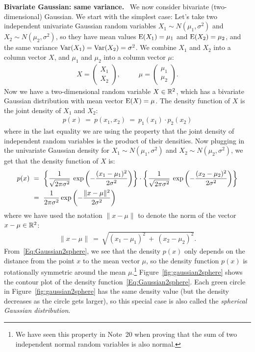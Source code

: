 \documentclass[11pt]{article}
\def\Ex#1{{\rm E}(#1)}
\def\Var#1{{\rm Var}(#1)}
\begin{document}
\smallskip
{\bf Bivariate Gaussian: same variance.}~
We now consider bivariate (two-dimensional) Gaussian. We start with the simplest case: Let's take two independent univariate Gaussian random variables $X_1 \sim N(\mu_1, \sigma^2)$ and $X_2 \sim N(\mu_2, \sigma^2)$, so they have mean values $\Ex{X_1} = \mu_1$ and $\Ex{X_2} = \mu_2$, and the same variance $\Var{X_1} = \Var{X_2} = \sigma^2$. We combine $X_1$ and $X_2$ into a column vector $X$, and $\mu_1$ and $\mu_2$ into a column vector $\mu$:
\begin{align*}
X = \begin{pmatrix} X_1 \\ X_2 \end{pmatrix}, ~~~~~~~~~~~~ \mu = \begin{pmatrix} \mu_1 \\ \mu_2 \end{pmatrix}.
\end{align*}
Now we have a two-dimensional random variable $X \in \mathbb{R}^2$, which has a bivariate Gaussian distribution with mean vector $\Ex{X} = \mu$. The density function of $X$ is the joint density of $X_1$ and $X_2$:
\begin{align*}
p(x) ~=~ p(x_1, x_2) ~=~ p_1(x_1) \cdot p_2(x_2)
\end{align*}
where in the last equality we are using the property that the joint density of independent random variables is the product of their densities. Now plugging in the univariate Gaussian density for $X_1 \sim N(\mu_1, \sigma^2)$ and $X_2 \sim N(\mu_2, \sigma^2)$, we get that the density function of $X$ is:
\begin{align}
p(x) ~&=~ \left\{\frac{1}{\sqrt{2\pi \sigma^2}} \: \exp\left(-\frac{(x_1-\mu_1)^2}{2\sigma^2} \right) \right\} \cdot \left\{\frac{1}{\sqrt{2\pi \sigma^2}} \: \exp\left(-\frac{(x_2-\mu_2)^2}{2\sigma^2} \right) \right\}  \notag \\
~&=~ \frac{1}{2\pi \sigma^2} \exp \left(- \frac{\|x - \mu\|^2}{2\sigma^2} \right)  \label{Eq:Gaussian2sphere}
\end{align}
where we have used the notation $\|x-\mu\|$ to denote the norm of the vector $x-\mu \in \mathbb{R}^2$:
\begin{align*}
\|x-\mu\| ~=~ \sqrt{(x_1-\mu_1)^2 \:+\: (x_2-\mu_2)^2}.
\end{align*}
From~\eqref{Eq:Gaussian2sphere}, we see that the density $p(x)$ only depends on the distance from the point $x$ to the mean vector $\mu$, so the density function $p(x)$ is rotationally symmetric around the mean $\mu$.\footnote{We have seen this property in Note~20 when proving that the sum of two independent normal random variables is also normal.} Figure~\ref{fig:gaussian2sphere} shows the contour plot of the density function~\eqref{Eq:Gaussian2sphere}. Each green circle in Figure~\ref{fig:gaussian2sphere} has the same density value (but the density decreases as the circle gets larger), so this special case is also called the {\em spherical Gaussian distribution}.
\end{document}
